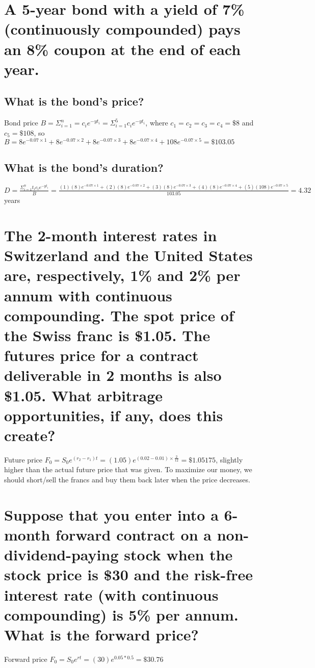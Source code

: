 \documentclass{article}
\begin{document}
\section{A 5-year bond with a yield of 7\% (continuously compounded) pays an 8\% coupon at the end of each year.}
\subsection{What is the bond's price?}
\par\noindent\Large Bond price $B = \Sigma_{i = 1}^{n} = c_{i}e^{-yt_{i}} = \Sigma_{i = 1}^{5}c_{i}e^{-yt_{i}}$, where $c_{1} = c_{2} = c_{3} = c_{4} = \$8$ and $c_{5} = \$108$, so $B = 8e^{-0.07 \times 1} + 8e^{-0.07 \times 2} + 8e^{-0.07 \times 3} + 8e^{-0.07 \times 4} + 108e^{-0.07 \times 5} = \$103.05$

\subsection{What is the bond's duration?}
\par\noindent\Large $D = \frac{\Sigma^{n}_{i = 1}t_{i}c_{i}e^{-yt_{i}}}{B} = \frac{(1)(8)e^{-0.07 \times 1} + (2)(8)e^{-0.07 \times 2} + (3)(8)e^{-0.07 \times 3} + (4)(8)e^{-0.07 \times 4} + (5)(108)e^{-0.07 \times 5}}{103.05} = 4.32$ years

\section{The 2-month interest rates in Switzerland and the United States are, respectively, 1\% and 2\% per annum with continuous compounding. The spot price of the Swiss franc is \$1.05. The futures price for a contract deliverable in 2 months is also \$1.05. What arbitrage opportunities, if any, does this create?}
\par\noindent\Large Future price $F_{0} = S_{0}e^{(r_{2} - r_{1})t} = (1.05)e^{(0.02 - 0.01) \times \frac{2}{12}} = \$1.05175$, slightly higher than the actual future price that was given.  To maximize our money, we should short/sell the francs and buy them back later when the price decreases.

\section{Suppose that you enter into a 6-month forward contract on a non-dividend-paying stock when the stock price is \$30 and the risk-free interest rate (with continuous compounding) is 5\% per annum. What is the forward price?}
\par\noindent\Large Forward price $F_{0} = S_{0}e^{rt} = (30)e^{0.05*0.5} = \$30.76$
\end{document}
